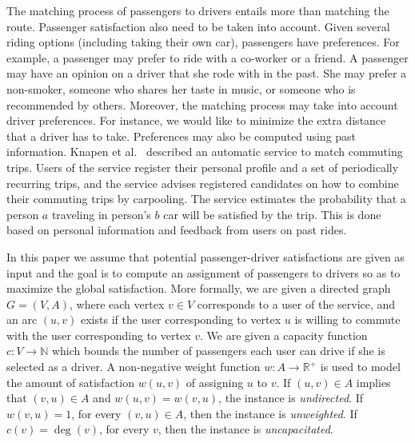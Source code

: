 \documentclass[11pt]{article}
\def\R{\mathbb{R}}
\def\N{\mathbb{N}}
\begin{document}
The matching process of passengers to drivers entails more than
matching the route.
%
Passenger satisfaction also need to be taken into account.  Given
several riding options (including taking their own car), passengers
have preferences.  For example, a passenger may prefer to ride with a
co-worker or a friend.  A passenger may have an opinion on a driver
that she rode with in the past.  She may prefer a non-smoker, someone
who shares her taste in music, or someone who is recommended by
others.
%
Moreover, the matching process may take into account driver
preferences.  For instance, we would like to minimize the extra
distance that a driver has to take.
%
Preferences may also be computed using past information.  Knapen et
al.~\cite{knapen2013estimating} described an automatic service to
match commuting trips.  Users of the service register their personal
profile and a set of periodically recurring trips, and the service
advises registered candidates on how to combine their commuting trips
by carpooling.  The service estimates the probability that a person
$a$ traveling in person's $b$ car will be satisfied by the trip.  This
is done based on personal information and feedback from users on past
rides.

In this paper we assume that potential passenger-driver satisfactions
are given as input and the goal is to compute an assignment of
passengers to drivers so as to maximize the global satisfaction.
%
More formally, we are given a directed graph $G = (V, A)$, where each
vertex $v \in V$ corresponds to a user of the service, and an arc $(u,
v)$ exists if the user corresponding to vertex $u$ is willing to
commute with the user corresponding to vertex $v$.  We are given a
capacity function $c: V \rightarrow \N$ which bounds the number of
passengers each user can drive if she is selected as a driver.  A
non-negative weight function $w : A \rightarrow \R^+$ is used to model
the amount of satisfaction $w(u,v)$ of assigning $u$ to $v$.
%
If $(u,v) \in A$ implies that $(v,u) \in A$ and $w(u,v) = w(v,u)$, the
instance is \emph{undirected}.  If $w(v,u) = 1$, for every $(v,u) \in
A$, then the instance is \emph{unweighted}.  If $c(v) = \deg(v)$, for
every $v$, then the instance is \emph{uncapacitated}.
\end{document}
